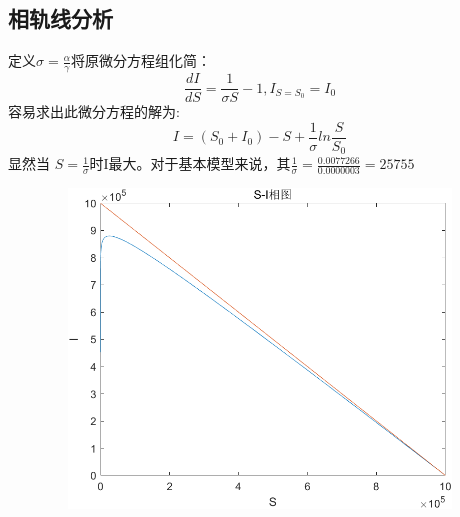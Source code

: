 \documentclass{article}
\begin{document}
\subsection{相轨线分析}
定义$\sigma =\frac{\alpha}{\gamma}$将原微分方程组化简：
$$\frac{dI}{dS}=\frac{1}{\sigma S}-1,I_{S=S_{0}}=I_{0}$$
容易求出此微分方程的解为:
$$I=(S_{0}+I_{0})-S+\frac{1}{\sigma} ln{\frac{S}{S_0}} $$
显然当
$S=\frac{1}{\sigma}$时I最大。对于基本模型来说，其$\frac{1}{\sigma}=\frac{0.0077266}{0.0000003}=25755$
\begin{figure}[h!]
                \centering
                \includegraphics[width=15cm,height=8.5cm]{4.png}
                \end{figure}
\end{document}
